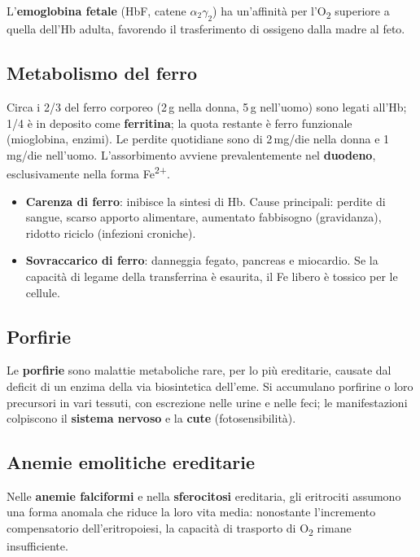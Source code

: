 L'\textbf{emoglobina fetale} (HbF, catene $\alpha_2\gamma_2$) ha un'affinità
per l'O\textsubscript{2} superiore a quella dell'Hb adulta, favorendo il
trasferimento di ossigeno dalla madre al feto.

\subsection{Metabolismo del ferro}

Circa i 2/3 del ferro corporeo (2\,g nella donna, 5\,g nell'uomo) sono
legati all'Hb; 1/4 è in deposito come \textbf{ferritina}; la quota restante è
ferro funzionale (mioglobina, enzimi). Le perdite quotidiane sono di
2\,mg/die nella donna e 1\,mg/die nell'uomo. L'assorbimento avviene
prevalentemente nel \textbf{duodeno}, esclusivamente nella forma
Fe\textsuperscript{2+}.

\begin{itemize}
  \item \textbf{Carenza di ferro}: inibisce la sintesi di Hb. Cause principali:
    perdite di sangue, scarso apporto alimentare, aumentato fabbisogno
    (gravidanza), ridotto riciclo (infezioni croniche).
  \item \textbf{Sovraccarico di ferro}: danneggia fegato, pancreas e miocardio.
    Se la capacità di legame della transferrina è esaurita, il Fe libero è
    tossico per le cellule.
\end{itemize}

\subsection{Porfirie}

Le \textbf{porfirie} sono malattie metaboliche rare, per lo più ereditarie,
causate dal deficit di un enzima della via biosintetica dell'eme. Si accumulano
porfirine o loro precursori in vari tessuti, con escrezione nelle urine e nelle
feci; le manifestazioni colpiscono il \textbf{sistema nervoso} e la
\textbf{cute} (fotosensibilità).

\subsection{Anemie emolitiche ereditarie}

Nelle \textbf{anemie falciformi} e nella \textbf{sferocitosi} ereditaria, gli
eritrociti assumono una forma anomala che riduce la loro vita media: nonostante
l'incremento compensatorio dell'eritropoiesi, la capacità di trasporto di
O\textsubscript{2} rimane insufficiente.

